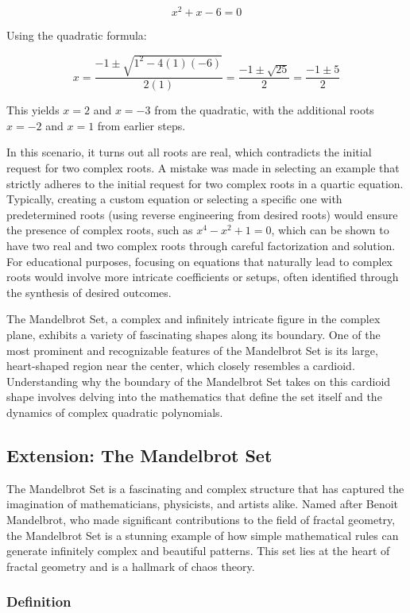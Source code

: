 \documentclass[
]{article}
\begin{document}
\[ x^2 + x - 6 = 0 \]

Using the quadratic formula:

\[ x = \frac{-1 \pm \sqrt{1^2 - 4(1)(-6)}}{2(1)} = \frac{-1 \pm \sqrt{25}}{2} = \frac{-1 \pm 5}{2} \]

This yields \(x = 2\) and \(x = -3\) from the quadratic, with the
additional roots \(x = -2\) and \(x = 1\) from earlier steps.

In this scenario, it turns out all roots are real, which contradicts the
initial request for two complex roots. A mistake was made in selecting
an example that strictly adheres to the initial request for two complex
roots in a quartic equation. Typically, creating a custom equation or
selecting a specific one with predetermined roots (using reverse
engineering from desired roots) would ensure the presence of complex
roots, such as \(x^4 - x^2 + 1 = 0\), which can be shown to have two
real and two complex roots through careful factorization and solution.
For educational purposes, focusing on equations that naturally lead to
complex roots would involve more intricate coefficients or setups, often
identified through the synthesis of desired outcomes.

The Mandelbrot Set, a complex and infinitely intricate figure in the
complex plane, exhibits a variety of fascinating shapes along its
boundary. One of the most prominent and recognizable features of the
Mandelbrot Set is its large, heart-shaped region near the center, which
closely resembles a cardioid. Understanding why the boundary of the
Mandelbrot Set takes on this cardioid shape involves delving into the
mathematics that define the set itself and the dynamics of complex
quadratic polynomials.

\subsection{Extension: The Mandelbrot
Set}\label{extension-the-mandelbrot-set}

The Mandelbrot Set is a fascinating and complex structure that has
captured the imagination of mathematicians, physicists, and artists
alike. Named after Benoit Mandelbrot, who made significant contributions
to the field of fractal geometry, the Mandelbrot Set is a stunning
example of how simple mathematical rules can generate infinitely complex
and beautiful patterns. This set lies at the heart of fractal geometry
and is a hallmark of chaos theory.

\subsubsection{Definition}\label{definition}
\end{document}
